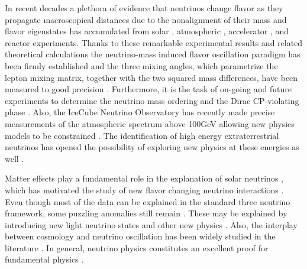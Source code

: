 \documentclass[3p,12pt]{elsarticle}
\begin{document}
In recent decades a plethora of evidence that neutrinos change
flavor as they propagate macroscopical distances due to the
nonalignment of their mass and flavor eigenstates \citep{Mohapatra:qv, Gouvea:2013fj} has accumulated from
solar \citep{Abe:2010hy, Borexino2014},
atmospheric \citep{PhysRevD.91.072004,Richard:2015aua},
accelerator \citep{PhysRevLett.112.181801,
  PhysRevD.93.051104,PhysRevLett.116.151806, PhysRevLett.110.251801}, and
reactor \citep{An:2013zwz,Abe:2015rcp, Kim:2016yvm} experiments.
Thanks to these remarkable
experimental results and related theoretical calculations the
  neutrino-mass induced flavor oscillation paradigm
\citep{Pontecorvo:1967fh,Gribov:1968kq,fukugita2003physics,
  Akhmedov:1999uz,Balantekin:2013kc, GonzalezGarcia:2007ib}
has been firmly established and the three mixing angles, which
parametrize the lepton mixing matrix, together with the two squared
mass differences, have been measured to good precision
\citep{Gonzalez-Garcia:2014bfa}. Furthermore, it is the task of on-going 
and future experiments to determine the neutrino mass ordering
and the Dirac CP-violating phase \citep{Hewett:2012et,
  Acciarri:2016crz,Aartsen:2014oha, Kouchner:2016pqa,DeRosa:2016ifc}. 
Also, the IceCube Neutrino Observatory has recently made precise measurements of the atmospheric
spectrum above 100GeV allowing new physics
models to be constrained \citep{Aartsen:2014gkd,TheIceCube:2016oqi}.
The identification of high energy
extraterrestrial neutrinos \citep{ Aartsen:2014gkd, Aartsen:2015rwa}
has opened the possibility of exploring new physics at these energies as well
\citep{Arguelles:2015dca, Bustamante:2015waa, Baerwald:2012kc}. 

Matter effects play a fundamental role in the explanation of solar
neutrinos \citep{ Davis:1968cp,Bethe:1986ej}, which has motivated the study of new flavor
changing neutrino interactions \citep{Barger:1991ae, Roulet:1991sm, GonzalezGarcia:2011my,
  Gonzalez-Garcia:2013usa, Pospelov:2011dp, Kopp:2014nosterile,
  Maltoni:2015kca}.
Even though most of the data can be explained in the standard three
neutrino framework, some puzzling anomalies still remain
\citep{LSND,Mention:2011rr,MiniBoone:2012dn}. These may be explained
by introducing new light neutrino states \citep{kopp2013sterile,
  Collin:2016rao, Abazajian:2012rf} and other new physics
\citep{Bai:2015ztj,PalomaresRuiz:2005vf,Gninenko:2011xa}.
Also, the interplay between cosmology and neutrino
oscillation has been widely studied in the literature
\citep{Bergstrom:2014fqa, Giusarma:2016phn,
  Dasgupta:2013la,Hernandez:2016kel,Arguelles:2016uwb}. 
In general, neutrino physics constitutes an excellent proof for
fundamental physics \citep{Hewett:2012et}.
\end{document}
